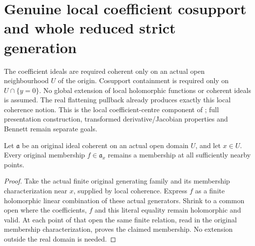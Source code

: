 \section{Genuine local coefficient cosupport and whole reduced strict generation}

The coefficient ideals are required coherent only on an actual open
neighbourhood $U$ of the origin. Cosupport containment is required only on
$U\cap\{y=0\}$. No global extension of local holomorphic functions or coherent
ideals is assumed. The real flattening pullback already produces exactly
this local coherence notion. This is the local coefficient-centre component
of \cite[Theorem 9.4, pp.~277--278]{bierstone-milman97-invent-math}; full
presentation construction, transformed derivative/Jacobian properties and
Bennett remain separate goals.

\begin{lemma}
\label{hir:actual-local-coefficient-germ-propagation}
\leanok
Let $\mathfrak a$ be an original ideal coherent on an actual open domain
$U$, and let $x\in U$. Every original membership $f\in\mathfrak a_x$
remains a membership at all sufficiently nearby points.
\end{lemma}
\begin{proof}
Take the actual finite original generating family and its membership
characterization near $x$, supplied by local coherence. Express $f$ as a
finite holomorphic linear combination of these actual generators. Shrink
to a common open where the coefficients, $f$ and this literal equality
remain holomorphic and valid. At each point of that open the same finite
relation, read in the original membership characterization, proves the
claimed membership. No extension outside the real domain is needed.
\end{proof}

